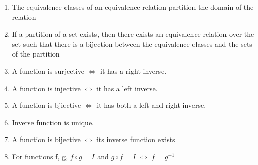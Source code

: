 \documentclass{article}
\begin{document}
\begin{enumerate}
\item The equivalence classes of an equivalence relation partition the domain of
the relation

\item If a partition of a set exists, then there exists an equivalence relation
over the set such that there is a bijection between the equivalence classes and
the sets of the partition

\item A function is surjective $\iff$ it has a right inverse.

\item A function is injective $\iff$ it has a left inverse.

\item A function is bjiective $\iff$ it has both a left and right inverse.

\item Inverse function is unique.

\item A function is bijective $\iff$ its inverse function exists

\item For functions f, g, $f \circ g = I$ and $g \circ f = I$ $\iff$ $f = g^{-1}$

\end{enumerate}
\end{document}
